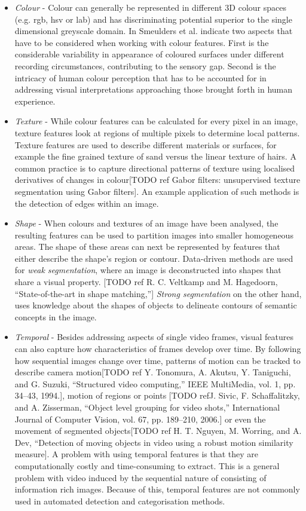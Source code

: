 \begin{itemize}
  \item \emph{Colour} - Colour can generally be represented in different 3D colour spaces (e.g. rgb, hsv or l\*a\*b) and has discriminating potential superior to the single dimensional greyscale domain. In \cite{Smeulders:2000tx} Smeulders et al. indicate two aspects that have to be considered when working with colour features. First is the considerable variability in appearance of coloured surfaces under different recording circumstances, contributing to the sensory gap. Second is the intricacy of human colour perception that has to be accounted for in addressing visual interpretations approaching those brought forth in human experience.
  \item \emph{Texture} - While colour features can be calculated for every pixel in an image, texture features look at regions of multiple pixels to determine local patterns. Texture features are used to describe different materials or surfaces, for example the fine grained texture of sand versus the linear texture of hairs. A common practice is to capture directional patterns of texture using localised derivatives of changes in colour[TODO ref Gabor filters:  unsupervised texture segmentation using Gabor filters]. An example application of such methods is the detection of edges within an image.

  \item \emph{Shape} - When colours and textures of an image have been analysed, the resulting features can be used to partition images into smaller homogeneous areas. The shape of these areas can next be represented by features that either describe the shape's region or contour. Data-driven methods are used for \emph{weak segmentation}, where an image is deconstructed into shapes that share a visual property. [TODO ref R. C. Veltkamp and M. Hagedoorn, “State-of-the-art in shape matching,”] \emph{Strong segmentation} on the other hand, uses knowledge about the shapes of objects to delineate contours of semantic concepts in the image.

  \item \emph{Temporal} - Besides addressing aspects of single video frames, visual features can also capture how characteristics of frames develop over time. By following how sequential images change over time, patterns of motion can be tracked to describe camera motion[TODO ref Y. Tonomura, A. Akutsu, Y. Taniguchi, and G. Suzuki, “Structured video computing,” IEEE MultiMedia, vol. 1, pp. 34–43, 1994.], motion of regions or points [TODO refJ. Sivic, F. Schaffalitzky, and A. Zisserman, “Object level grouping for video shots,” International Journal of Computer Vision, vol. 67, pp. 189–210, 2006.] or even the movement of segmented objects[TODO ref H. T. Nguyen, M. Worring, and A. Dev, “Detection of moving objects in video using a robust motion similarity measure]. A problem with using temporal features is that they are computationally costly and time-consuming to extract. This is a general problem with video induced by the sequential nature of consisting of information rich images. Because of this, temporal features are not commonly used in automated detection and categorisation methods.


\end{itemize}
